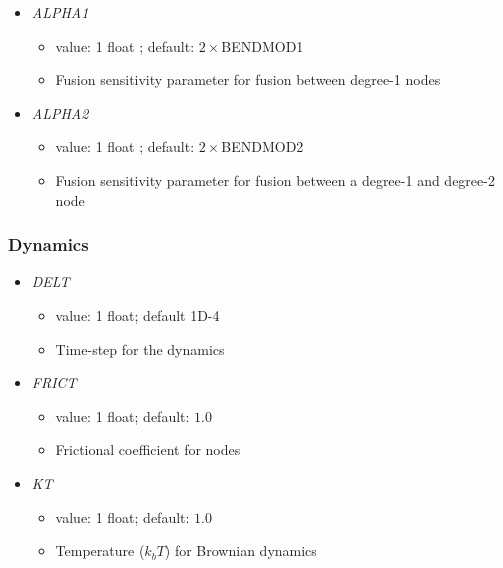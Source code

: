 \documentclass[12pt]{article}
\begin{document}
\begin{itemize}
\begin{itemize}
  \end{itemize}
%
\item {\it ALPHA1}
\begin{itemize}
  \item  value: 1 float ; default: $2\times$BENDMOD1
  \item Fusion sensitivity parameter for fusion between degree-1 nodes
\end{itemize}
%
\item {\it ALPHA2}
\begin{itemize}
\item  value: 1 float ; default: $2\times$BENDMOD2
\item Fusion sensitivity parameter for fusion between a degree-1 and degree-2 node
\end{itemize}
\end{itemize}

\subsubsection*{Dynamics}
\begin{itemize}
%
\item {\it DELT}
  \begin{itemize}
    \item  value: 1 float; default 1D-4
    \item Time-step for the dynamics
  \end{itemize}
%
\item {\it FRICT}
  \begin{itemize}
    \item  value: 1 float; default: $1.0$
    \item Frictional coefficient for nodes
  \end{itemize}
%
\item {\it KT}
  \begin{itemize}
    \item  value: 1 float; default: $1.0$
    \item Temperature ($k_b T$) for Brownian dynamics
  \end{itemize}
\end{itemize}
\end{document}
